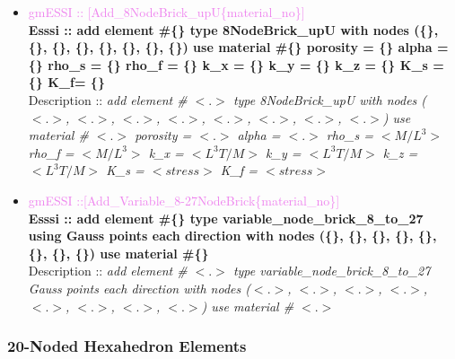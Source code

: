 \documentclass[11pt]{article}
\begin{document}
\begin{itemize}
      \item \textcolor{violet}{gmESSI :: [Add\_8NodeBrick\_upU\{material\_no\}]} \\     
      \textbf{Esssi :: add element \#\{\} type 8NodeBrick\_upU with nodes (\{\}, \{\}, \{\}, \{\}, \{\}, \{\}, \{\}, \{\}) use material \#\{\} porosity = \{\} alpha = \{\} rho\_s = \{\} rho\_f = \{\} k\_x = \{\} k\_y = \{\} k\_z = \{\} K\_s = \{\} K\_f= \{\}}\\
      Description :: \textit{ add element \# $<.>$ type 8NodeBrick\_upU with nodes ($<.>$, $<.>$, $<.>$, $<.>$, $<.>$, $<.>$, $<.>$, $<.>$) use material \# $<.>$ porosity = $<.>$ alpha = $<.>$  rho\_s = $<M/L^3>$  rho\_f = $<M/L^3>$ k\_x = $<L^3T/M>$  k\_y = $<L^3T/M>$  k\_z = $<L^3T/M>$  K\_s = $<stress>$ K\_f = $<stress>$}

      \item \textcolor{violet}{gmESSI ::[Add\_Variable\_8-27NodeBrick\{material\_no\}]} \\             
      \textbf{Esssi :: add element \#\{\} type variable\_node\_brick\_8\_to\_27 using  Gauss points each direction with nodes (\{\}, \{\}, \{\}, \{\}, \{\}, \{\}, \{\}, \{\}) use material \#\{\}}\\
      Description :: \textit{ add element \# $<.>$ type variable\_node\_brick\_8\_to\_27 Gauss points each direction with nodes ($<.>$, $<.>$, $<.>$, $<.>$, $<.>$, $<.>$, $<.>$, $<.>$) use material \# $<.>$}


  \end{itemize}

\subsubsection{20-Noded Hexahedron Elements}
\end{document}
